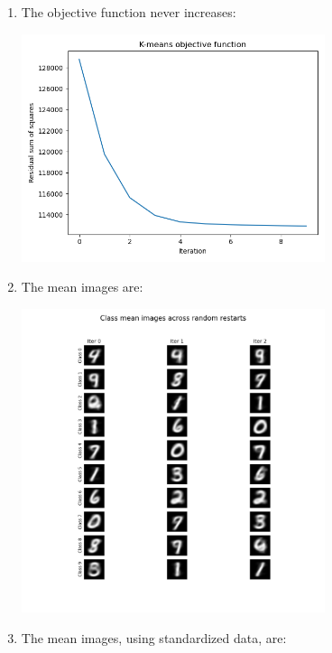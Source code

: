 \documentclass[submit]{harvardml}
\begin{document}
\begin{enumerate}
	\item The objective function never increases:
		
	\begin{center}
		\includegraphics[width=0.7\textwidth]{kmeans_obj}
	\end{center}

	\item The mean images are:

	\begin{center}
		\includegraphics[width=0.7\textwidth]{kmeans}
	\end{center}

	\item The mean images, using standardized data, are:


\end{enumerate}
\end{document}
